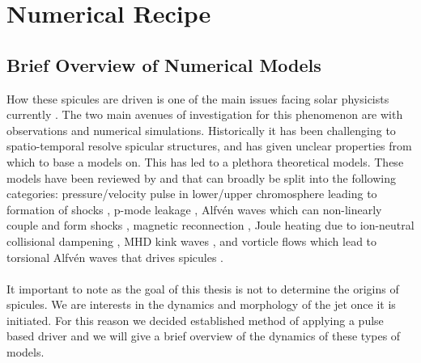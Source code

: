 \documentclass[12pt]{ociamthesis}
\newcommand{\Alfven}{Alfv\'{e}n }
\newcommand{\np}{\\ \\}
\begin{document}
\baselineskip=18pt


\chapter{Numerical Recipe}
\label{chap:Numerical_Recipe}
\section{Brief Overview of Numerical Models}
\label{sec:models}
How these spicules are driven is one of the main issues facing solar physicists currently \citep{Tsiropoula2012,kuzma2017ApJ84978K,Martinez-Sykora2017}. The two main avenues of investigation for this phenomenon are with observations and numerical simulations. Historically it has been challenging to spatio-temporal resolve spicular structures, and has given unclear properties from which to base a models on. This has led to a plethora theoretical models. These models have been reviewed by \cite{Sterling_2000SoPh} and \cite{Aschwanden2019ASSL} that can broadly be split into the following categories: pressure/velocity pulse in lower/upper chromosphere leading to formation of shocks \citep{Shibata1982,Suematsu1982SoPh7599S,Hollweg1982ApJ257345H,Sterling1990ApJ349647S,Heggland2007ApJ6661277H,kuzma2017ApJ84978K}, p-mode leakage \citep{Pontieu2004Natur},  \Alfven waves which can non-linearly couple and form shocks \citep{Hollweg1982SoPh7535H,Hollweg1992ApJ389731H, Kudoh1999ApJ514493K, Matsumoto2010ApJ7101857M}, magnetic reconnection \citep{Yokoyama1995Natur37542Y,Yokoyama1996PASJ48353Y, Archontis2005ApJ6351299A, Pontieu2007PASJ,Isobe2008ApJ679L57I,Nishizuka2008ApJ683L83N,Sterling2010ApJ,Gonz2017ApJ,Gonz2018arXiv180704224G,Gonz2018ApJ856176G}, Joule heating due to ion-neutral collisional dampening \citep{Haerendel1992Natur360241H,James2003AA}, MHD kink waves \citep{Kukhianidze2006A&A}, and vorticle flows which lead to torsional \Alfven waves that drives spicules \citep{Iijima2017ApJ,Samanta2019Sci}. \np
%
It important to note as the goal of this thesis is not to determine the origins of spicules. We are interests in the dynamics and morphology of the jet once it is initiated. For this reason we decided established method of applying a pulse based driver and we will give a brief overview of the dynamics of these types of models.   
\end{document}
